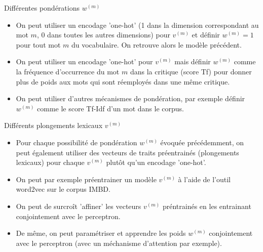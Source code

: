 \documentclass{beamer}
\begin{document}
\begin{frame}{Diff\'erentes pond\'erations $w^{(m)}$} 
  \begin{itemize}
  \item On peut utiliser un encodage 'one-hot' (1 dans la dimension correspondant au mot $m$, $0$ dans toutes les autres dimensions) pour $v^{(m)}$ et d\'efinir $w^{(m)} = 1$ pour tout mot $m$ du vocabulaire. On retrouve alors le mod\`ele pr\'ec\'edent.
  \item On peut utiliser un encodage 'one-hot' pour $v^{(m)}$ mais d\'efinir $w^{(m)}$ comme la fr\'equence d'occurrence du mot $m$ dans la critique (score Tf) pour donner plus de poids aux mots qui sont r\'eemploy\'es dans une m\^eme critique.
  \item On peut utiliser d'autres m\'ecanismes de pond\'eration, par exemple d\'efinir $w^{(m)}$ comme le score Tf-Idf d'un mot dans le corpus.
  \end{itemize}
\end{frame}

\begin{frame}{Diff\'erents plongements lexicaux $v^{(m)}$}
  \begin{itemize}
  \item Pour chaque possibilit\'e de pond\'eration $w^{(m)}$ \'evoqu\'ee pr\'ec\'edemment, on peut \'egalement utiliser des vecteurs de traits pr\'eentrain\'es (plongements lexicaux) pour chaque $v^{(m)}$ plut\^ot qu'un encodage 'one-hot'.
  \item On peut par exemple pr\'eentrainer un mod\`ele $v^{(m)}$ \`a l'aide de l'outil word2vec sur le corpus IMBD.
  \item On peut de surcro\^it 'affiner' les vecteurs $v^{(m)}$ pr\'entrain\'es en les entrainant conjointement avec le perceptron.
  \item De m\^eme, on peut param\'etriser et apprendre les poids $w^{(m)}$ conjointement avec le perceptron (avec un m\'echanisme d'attention par exemple).
  \end{itemize}
\end{frame}
\end{document}

